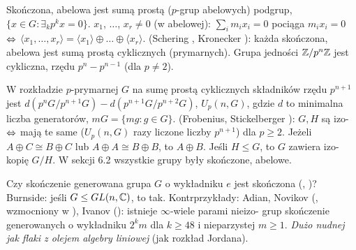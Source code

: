 Skończona,  abelowa jest sumą prostą  ($p$-grup abelowych) podgrup,  $\{x \in G : \exists_k p^k x = 0\}$.
 $x_1$, $\ldots$, $x_r \neq 0$ (w abelowej): $\sum_i m_i x_i = 0$ pociąga $m_i x_i = 0$ $\Leftrightarrow$ $\langle x_1, \ldots, x_r \rangle = \langle x_1 \rangle \oplus \ldots \oplus \langle x_r \rangle$.
 (Schering , Kronecker ): każda skończona, abelowa jest sumą prostą cyklicznych (prymarnych).
Grupa jedności $\mathbb{Z}/p^n \mathbb{Z}$ jest cykliczna, rzędu $p^n - p^{n-1}$ (dla $p \neq 2$).

W  rozkładzie $p$-prymarnej $G$ na sumę prostą cyklicznych składników rzędu $p^{n+1}$ jest $d(p^nG / p^{n+1}G) - d(p^{n+1}G / p^{n+2}G)$, $U_p(n, G)$, gdzie $d$ to minimalna liczba generatorów, $mG = \{mg : g \in G\}$.
 (Frobenius, Stickelberger ): $G, H$ są izo- $\Leftrightarrow$ mają te same  ($U_p(n, G)$ razy liczone liczby $p^{n+1}$) dla $p \ge 2$.
Jeżeli $A \oplus C \cong B \oplus C$ lub $A \oplus A \cong B \oplus B$, to $A \oplus B$.
Jeśli $H \le G$, to $G$ zawiera izo-kopię $G/H$.
W sekcji 6.2 wszystkie grupy były skończone, abelowe.

Czy  skończenie generowana grupa $G$ o wykładniku $e$ jest skończona (, )?
Burnside: jeśli $G \le GL (n, \mathbb{C})$, to tak.
Kontrprzykłady: Adian, Novikov (, wzmocniony w ), Ivanov (): istnieje $\infty$-wiele parami nieizo- grup skończenie generowanych o wykładniku $2^k m$ dla $k \ge 48$ i nieparzystej $m \ge 1$.
\emph{Dużo nudnej jak flaki z olejem algebry liniowej} (jak rozkład Jordana). %


